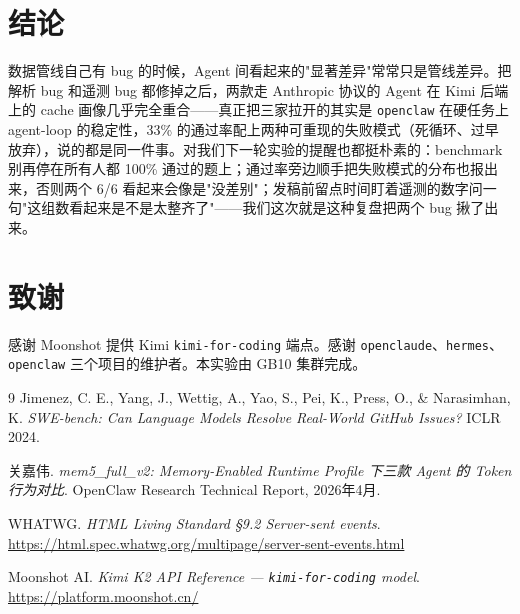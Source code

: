 \documentclass[11pt,a4paper]{article}
\begin{document}
\section{结论}
数据管线自己有 bug 的时候，Agent 间看起来的"显著差异"常常只是管线差异。把解析 bug 和遥测 bug 都修掉之后，两款走 Anthropic 协议的 Agent 在 Kimi 后端上的 cache 画像几乎完全重合——真正把三家拉开的其实是 \texttt{openclaw} 在硬任务上 agent-loop 的稳定性，33\% 的通过率配上两种可重现的失败模式（死循环、过早放弃），说的都是同一件事。对我们下一轮实验的提醒也都挺朴素的：benchmark 别再停在所有人都 100\% 通过的题上；通过率旁边顺手把失败模式的分布也报出来，否则两个 6/6 看起来会像是"没差别"；发稿前留点时间盯着遥测的数字问一句"这组数看起来是不是太整齐了"——我们这次就是这种复盘把两个 bug 揪了出来。

\section*{致谢}
感谢 Moonshot 提供 Kimi \texttt{kimi-for-coding} 端点。感谢 \texttt{openclaude}、\texttt{hermes}、\texttt{openclaw} 三个项目的维护者。本实验由 GB10 集群完成。

\begin{thebibliography}{9}
Jimenez, C. E., Yang, J., Wettig, A., Yao, S., Pei, K., Press, O., \& Narasimhan, K.
\textit{SWE-bench: Can Language Models Resolve Real-World GitHub Issues?}
ICLR 2024.

关嘉伟.
\textit{mem5\_full\_v2: Memory-Enabled Runtime Profile 下三款 Agent 的 Token 行为对比}.
OpenClaw Research Technical Report, 2026年4月.

WHATWG.
\textit{HTML Living Standard §9.2 Server-sent events}.
\url{https://html.spec.whatwg.org/multipage/server-sent-events.html}

Moonshot AI.
\textit{Kimi K2 API Reference — \texttt{kimi-for-coding} model}.
\url{https://platform.moonshot.cn/}

\end{thebibliography}
\end{document}
